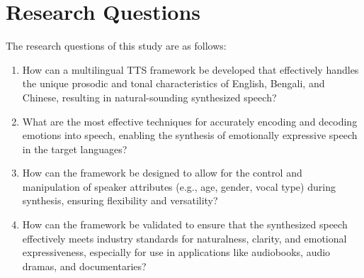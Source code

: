 \section*{ Research Questions}

The research questions of this study are as follows:
\begin{enumerate}

    \item How can a multilingual TTS framework be developed that effectively handles the unique prosodic and tonal characteristics of English, Bengali, and Chinese, resulting in natural-sounding synthesized speech?
    
    \item What are the most effective techniques for accurately encoding and decoding emotions into speech, enabling the synthesis of emotionally expressive speech in the target languages? 

    \item How can the framework be designed to allow for the control and manipulation of speaker attributes (e.g., age, gender, vocal type) during synthesis, ensuring flexibility and versatility? 

    \item How can the framework be validated to ensure that the synthesized speech effectively meets industry standards for naturalness, clarity, and emotional expressiveness, especially for use in applications like audiobooks, audio dramas, and documentaries? 
\end{enumerate}